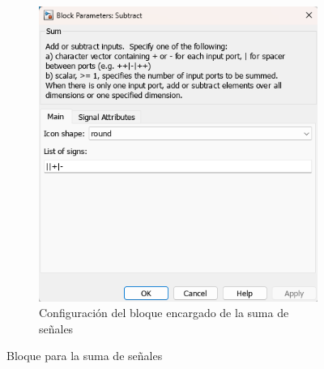 \begin{figure}[htbp]
\begin{subfigure}[b]{0.45\textwidth}
        \includegraphics[width=\textwidth]{fig/Capitulo5/Caso_de_estudio_IMU/Generador_de_salidas/configuracion_bloque_suma.png}
        \caption{Configuración del bloque encargado de la suma de señales}
        \label{fig:config_add_IMU}
    \end{subfigure}
    \caption{Bloque para la suma de señales}
    \label{fig:add_of_some_signals}
\end{figure}


